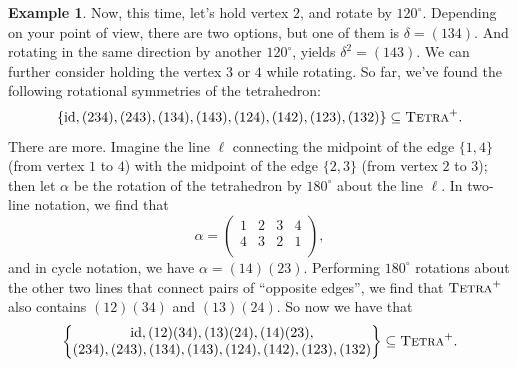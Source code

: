 \documentclass[11pt]{amsart}
\theoremstyle{plain}
\theoremstyle{definition}
\newtheorem{example}{Example}
\theoremstyle{remark}
\newcommand{\rsymtetra}{\textsc{Tetra}^+}
\DeclareMathOperator{\id}{id}
\begin{document}
\begin{example}
Now, this time, let's hold vertex $2$, and rotate by $120^\circ$. Depending on your point of view, there are two options, but one of them is $\delta = (134)$. And rotating in the same direction by another $120^\circ$, yields $\delta^2 = (143)$. We can further consider holding the vertex $3$ or $4$ while rotating. So far, we've found the following rotational symmetries of the tetrahedron:
\[\{\id, (234), (243), (134), (143), (124), (142), (123), (132)\} \subseteq \rsymtetra.\]
There are more. Imagine the line $\ell$ connecting the midpoint of the edge $\{1,4\}$ (from vertex $1$ to $4$) with the midpoint of the edge $\{2,3\}$ (from vertex $2$ to $3$); then let $\alpha$ be the rotation of the tetrahedron by $180^\circ$ about the line $\ell$.  In two-line notation, we find that 
\[\alpha = \begin{pmatrix}
1 & 2 & 3 & 4\\
4 & 3 & 2 & 1\\
\end{pmatrix},\]
and in cycle notation, we have $\alpha = (14)(23)$. Performing $180^\circ$ rotations about the other two lines that connect pairs of ``opposite edges'', we find that $\rsymtetra$ also contains $(12)(34)$ and $(13)(24)$. So now we have that 
\[
\begin{Bmatrix}
\id,(12)(34), (13)(24), (14)(23),  \\
(234), (243), (134), (143), (124), (142), (123), (132)
\end{Bmatrix}
\subseteq \rsymtetra.\]


\end{example}
\end{document}
